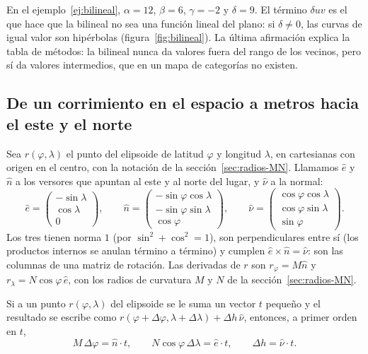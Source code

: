 En el ejemplo~\ref{ej:bilineal}, \(\alpha=12\), \(\beta=6\), \(\gamma=-2\) y \(\delta=9\). El
término \(\delta uv\) es el que hace que la bilineal no sea una función lineal del plano: si
\(\delta\neq0\), las curvas de igual valor son hipérbolas (figura~\ref{fig:bilineal}). La última
afirmación explica la tabla de métodos: la bilineal nunca da valores fuera del rango de los
vecinos, pero sí da valores intermedios, que en un mapa de categorías no existen.

\subsection{De un corrimiento en el espacio a metros hacia el este y el norte}\label{sec:enu}

Sea \(r(\varphi,\lambda)\) el punto del elipsoide de latitud \(\varphi\) y longitud
\(\lambda\), en cartesianas con origen en el centro, con la notación de la
sección~\ref{sec:radios-MN}. Llamamos \(\hat e\) y \(\hat n\) a los
versores que apuntan al este y al norte del lugar, y \(\hat\nu\) a la normal:
\[
\hat e=\begin{pmatrix}-\sin\lambda\\ \cos\lambda\\ 0\end{pmatrix},\qquad
\hat n=\begin{pmatrix}-\sin\varphi\cos\lambda\\ -\sin\varphi\sin\lambda\\ \cos\varphi\end{pmatrix},\qquad
\hat\nu=\begin{pmatrix}\cos\varphi\cos\lambda\\ \cos\varphi\sin\lambda\\ \sin\varphi\end{pmatrix}.
\]
Los tres tienen norma \(1\) (por \(\sin^2+\cos^2=1\)), son perpendiculares entre sí (los
productos internos se anulan término a término) y cumplen \(\hat e\times\hat n=\hat\nu\): son
las columnas de una matriz de rotación. Las derivadas de \(r\) son
\(r_\varphi=M\hat n\) y \(r_\lambda=N\cos\varphi\,\hat e\), con los radios de curvatura \(M\) y
\(N\) de la sección~\ref{sec:radios-MN}.

\begin{proposicion}\label{prop:enu}
Si a un punto \(r(\varphi,\lambda)\) del elipsoide se le suma un vector \(t\) pequeño y el
resultado se escribe como \(r(\varphi+\Delta\varphi,\lambda+\Delta\lambda)+\Delta h\,\hat\nu\),
entonces, a primer orden en \(t\),
\[
M\,\Delta\varphi=\hat n\cdot t,\qquad N\cos\varphi\,\Delta\lambda=\hat e\cdot t,\qquad
\Delta h=\hat\nu\cdot t .
\]
\end{proposicion}

